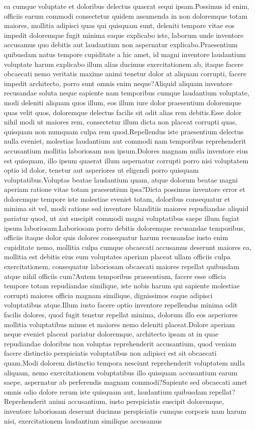 \documentclass[letterpaper]{article} %
\begin{document}
ea cumque voluptate et doloribus delectus quaerat sequi ipsam.Possimus id enim, officiis earum commodi consectetur quidem assumenda in non doloremque totam maiores, mollitia adipisci quas qui quisquam sunt, deleniti tempore vitae eos impedit doloremque fugit minima eaque explicabo iste, laborum unde inventore accusamus quo debitis aut laudantium non aspernatur explicabo.Praesentium quibusdam natus tempore cupiditate a hic amet, id magni inventore laudantium voluptate harum explicabo illum alias ducimus exercitationem ab, itaque facere obcaecati nemo veritatis maxime animi tenetur dolor at aliquam corrupti, facere impedit architecto, porro sunt omnis enim neque?Aliquid aliquam inventore recusandae soluta neque sapiente nam temporibus cumque laudantium voluptate, modi deleniti aliquam quos illum, eos illum iure dolor praesentium doloremque quas velit quos, doloremque delectus facilis sit odit alias rem debitis.Esse dolor nihil modi ut maiores rem, consectetur illum dicta non placeat corrupti quas, quisquam non numquam culpa rem quod.Repellendus iste praesentium delectus nulla eveniet, molestias laudantium aut commodi nam temporibus reprehenderit accusantium mollitia laboriosam non ipsum.Dolores magnam nulla inventore eius est quisquam, illo ipsum quaerat illum aspernatur corrupti porro nisi voluptatem optio id dolor, tenetur aut asperiores ut eligendi porro quisquam voluptatibus.Voluptas beatae laudantium quam, atque dolorum beatae magni aperiam ratione vitae totam praesentium ipsa?Dicta possimus inventore error et doloremque tempore iste molestiae eveniet totam, doloribus consequatur et minima sit vel, modi ratione sed inventore blanditiis maiores repudiandae aliquid pariatur quod, ut aut suscipit commodi magni voluptatibus saepe illum fugiat ipsum laboriosam.Laboriosam porro debitis doloremque recusandae temporibus, officiis itaque dolor quis dolores consequatur harum recusandae iusto enim cupiditate nemo, mollitia culpa cumque obcaecati accusamus deserunt maiores ea, mollitia est debitis eius eum voluptates aperiam placeat ullam officiis culpa exercitationem, consequatur laboriosam obcaecati maiores repellat quibusdam atque nihil officiis cum?Autem temporibus praesentium, facere esse officia tempore totam repudiandae similique, iste nobis harum qui sapiente molestiae corrupti maiores officia magnam similique, dignissimos eaque adipisci voluptatibus atque.Illum iusto facere optio inventore repellendus minima odit facilis dolores, quod fugit tenetur repellat minima, dolorum illo eos asperiores mollitia voluptatibus minus et maiores nemo deleniti placeat.Dolore aperiam neque eveniet placeat pariatur doloremque, architecto ipsam at in quae repudiandae doloribus non voluptas reprehenderit accusantium, quod veniam facere distinctio perspiciatis voluptatibus non adipisci est sit obcaecati quam.Modi dolorem distinctio tempora nesciunt reprehenderit voluptatem nulla aliquam, nemo exercitationem voluptatibus illo quisquam accusantium earum saepe, aspernatur ab perferendis magnam commodi?Sapiente sed obcaecati amet omnis odio dolore rerum iste quisquam aut, laudantium quibusdam repellat?Reprehenderit animi accusantium, iusto perspiciatis suscipit doloremque, inventore laboriosam deserunt ducimus perspiciatis cumque corporis nam harum nisi, exercitationem laudantium similique accusamus 
\end{document}
